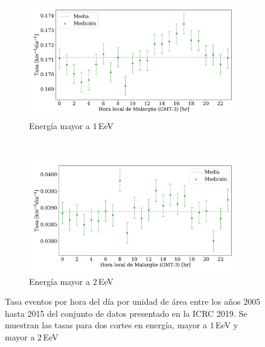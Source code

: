    \begin{figure}[H]
       \centering
       \begin{subfigure}[b]{0.9\textwidth}
       \includegraphics[width=\textwidth]{Graphs/rate_hour_of_the_day/herald_above_1EeV_hour_of_the_day.pdf}
       \caption{Energía mayor a $1\,$EeV}
       \label{fig:rate_day_ICRC_19_05_18_2EeV}
       \end{subfigure}\\
       \centering
       \begin{subfigure}[b]{0.9\textwidth}
       \includegraphics[width=\textwidth]{Graphs/rate_hour_of_the_day/herald_above_2EeV_hour_of_the_day.pdf}
       \caption{Energía mayor a $2\,$EeV}
       \label{fig:rate_2015_ICRC_19_05_18_2EeV}
       \end{subfigure}%
       \caption{Tasa eventos  por hora del día por unidad de área entre los años 2005 hasta 2015 del conjunto de datos presentado en la ICRC 2019.  Se muestran las tasas para dos cortes en energía, mayor a $1\,$EeV y mayor a $2\,$EeV}\label{fig:rate_new_18_2EeV}
   \end{figure}



